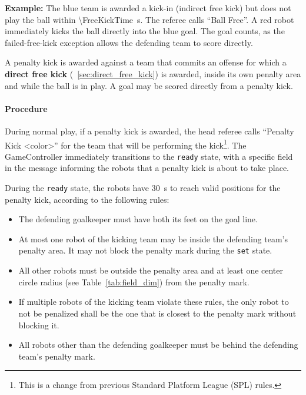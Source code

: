 \textbf{Example:} The blue team is awarded a kick-in (indirect free kick) but does not play the ball within \qty{\FreeKickTime}{\second}. The referee calls ``Ball Free''. A red robot immediately kicks the ball directly into the blue goal. The goal counts, as the failed-free-kick exception allows the defending team to score directly.

\label{sec:penalty_kick}


A penalty kick is awarded against a team that commits an offense for which a \textbf{direct free kick} (\cf~\cref{sec:direct_free_kick}) is awarded, inside its own penalty area and while the ball is in play. A goal may be scored directly from a penalty kick.

\paragraph{Procedure}

During normal play, if a penalty kick is awarded, the head referee calls ``Penalty Kick \textless color\textgreater'' for the team that will be performing the kick\footnote{This is a change from previous Standard Platform League (SPL) rules.}. The GameController immediately transitions to the \texttt{ready} state, with a specific field in the message informing the robots that a penalty kick is about to take place.

During the \texttt{ready} state, the robots have \qty{30}{\second} to reach valid positions for the penalty kick, according to the following rules:

\begin{itemize}
  \item The defending goalkeeper must have both its feet on the goal line.
  \item At most one robot of the kicking team may be inside the defending team's penalty area. It may not block the penalty mark during the \texttt{set} state.
  \item All other robots must be outside the penalty area and at least one center circle radius (see Table~\ref{tab:field_dim}) from the penalty mark.
  \item If multiple robots of the kicking team violate these rules, the only robot to not be penalized shall be the one that is closest to the penalty mark without blocking it.
  \item All robots other than the defending goalkeeper must be behind the defending team's penalty mark.
\end{itemize}

